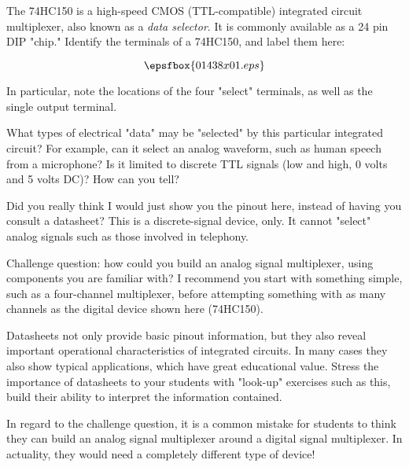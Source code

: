 

The 74HC150 is a high-speed CMOS (TTL-compatible) integrated circuit multiplexer, also known as a {\it data selector}.  It is commonly available as a 24 pin DIP "chip."  Identify the terminals of a 74HC150, and label them here:

\vskip 10pt

$$\epsfbox{01438x01.eps}$$

\vskip 10pt

In particular, note the locations of the four "select" terminals, as well as the single output terminal.

\vskip 10pt

What types of electrical "data" may be "selected" by this particular integrated circuit?  For example, can it select an analog waveform, such as human speech from a microphone?  Is it limited to discrete TTL signals (low and high, 0 volts and 5 volts DC)?  How can you tell?







Did you really think I would just show you the pinout here, instead of having you consult a datasheet?  This is a discrete-signal device, only.  It cannot "select" analog signals such as those involved in telephony.

\vskip 10pt

Challenge question: how could you build an analog signal multiplexer, using components you are familiar with?  I recommend you start with something simple, such as a four-channel multiplexer, before attempting something with as many channels as the digital device shown here (74HC150).







Datasheets not only provide basic pinout information, but they also reveal important operational characteristics of integrated circuits.  In many cases they also show typical applications, which have great educational value.  Stress the importance of datasheets to your students with "look-up" exercises such as this, build their ability to interpret the information contained.

In regard to the challenge question, it is a common mistake for students to think they can build an analog signal multiplexer around a digital signal multiplexer.  In actuality, they would need a completely different type of device!




